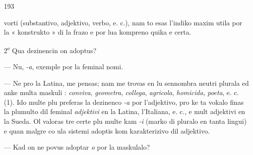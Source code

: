 \begin{VUpage}[197]{193}

\VUcontinue
vorti (substantivo, adjektivo, verbo, e. c.), nam to esas\nl
l'indiko maxim utila por la « konstrukto » di la frazo e\nl
por lua kompreno quika e certa.

2\textsuperscript{e} Qua dezinencin on adoptus?

--- Nu, \textit{-a}, exemple por la feminal nomi.

--- Ne pro la Latina, me pensas; nam me trovas en lu\nl
sennombra neutri plurala ed anke multa maskuli : \textit{conviva},\nl
\textit{geometra}, \textit{collega}, \textit{agricola}, \textit{homicida}, \textit{poeta}, e. c. (1). Ido\nl
multe plu preferas la dezinenco \textit{-a} por l'adjektivo, pro ke\nl
ta vokalo finas la plumulto dil feminal \textit{adjektivi} en la\nl
Latina, l'Italiana, e. c., e mult adjektivi en la Sueda. Ol\nl
valoras tre certe plu multe kam \textit{-i} (marko di pluralo en\nl
tanta lingui) e quan malgre co ula sistemi adoptis kom\nl
karakterizivo dil adjektivo.

--- Kad on ne povus adoptar \textit{o} por la maskulalo?


\end{VUpage}
